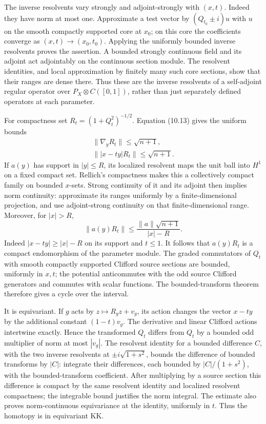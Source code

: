 \documentclass[
  11pt,
]{article}
\begin{document}
The inverse resolvents vary strongly and adjoint-strongly with
\((x,t)\). Indeed they have norm at most one. Approximate a test vector
by \((Q_{t_0}\pm i)u\) with \(u\) on the smooth compactly supported core
at \(x_0\); on this core the coefficients converge as
\((x,t)\to(x_0,t_0)\). Applying the uniformly bounded inverse resolvents
proves the assertion. A bounded strongly continuous field and its
adjoint act adjointably on the continuous section module. The resolvent
identities, and local approximation by finitely many such core sections,
show that their ranges are dense there. Thus these are the inverse
resolvents of a self-adjoint regular operator over
\(P_X\otimes C([0,1])\), rather than just separately defined operators
at each parameter.

For compactness set \(R_t=(1+Q_t^2)^{-1/2}\). Equation (10.13) gives the
uniform bounds \[
\begin{gathered}
\|\nabla_yR_t\|\leq\sqrt{n+1},\\
\||x-t y|R_t\|\leq\sqrt{n+1}.
\end{gathered}
\tag{10.14}
\] If \(a(y)\) has support in \(|y|\leq R\), its localized resolvent
maps the unit ball into \(H^1\) on a fixed compact set. Rellich's
compactness makes this a collectively compact family on bounded
\(x\)-sets. Strong continuity of it and its adjoint then implies norm
continuity: approximate its ranges uniformly by a finite-dimensional
projection, and use adjoint-strong continuity on that finite-dimensional
range. Moreover, for \(|x|>R\), \[
\|a(y)R_t\|
\leq\frac{\|a\|\sqrt{n+1}}{|x|-R}.
\tag{10.15}
\] Indeed \(|x-t y|\geq|x|-R\) on its support and \(t\leq1\). It follows
that \(a(y)R_t\) is a compact endomorphism of the parameter module. The
graded commutators of \(Q_t\) with smooth compactly supported Clifford
source sections are bounded, uniformly in \(x,t\); the potential
anticommutes with the odd source Clifford generators and commutes with
scalar functions. The bounded-transform theorem therefore gives a cycle
over the interval.

It is equivariant. If \(g\) acts by \(z\mapsto R_gz+v_g\), its action
changes the vector \(x-t y\) by the additional constant \((1-t)v_g\).
The derivative and linear Clifford actions intertwine exactly. Hence the
transformed \(Q_t\) differs from \(Q_t\) by a bounded odd multiplier of
norm at most \(|v_g|\). The resolvent identity for a bounded difference
\(C\), with the two inverse resolvents at \(\pm i\sqrt{1+s^2}\), bounds
the difference of bounded transforms by \(|C|\): integrate their
differences, each bounded by \(|C|/(1+s^2)\), with the bounded-transform
coefficient. After multiplying by a source section this difference is
compact by the same resolvent identity and localized resolvent
compactness; the integrable bound justifies the norm integral. The
estimate also proves norm-continuous equivariance at the identity,
uniformly in \(t\). Thus the homotopy is in equivariant KK.
\end{document}

